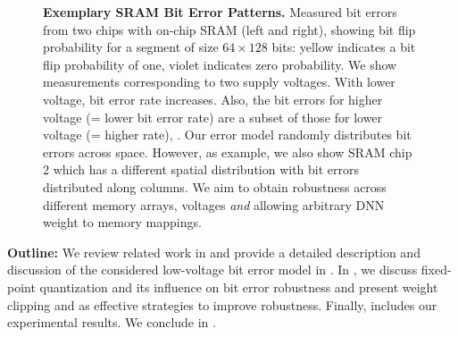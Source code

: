 \begin{figure}
	\vspace*{-8px}
	\caption{\textbf{Exemplary SRAM Bit Error Patterns.} Measured bit errors from two chips with on-chip SRAM (left and right), showing bit flip probability for a segment of size $64 \times 128$ bits: {\color{yellow!75!black}yellow} indicates a bit flip probability of one, {\color{violet}violet} indicates zero probability. We show measurements corresponding to two supply voltages. %
	With lower voltage, bit error rate increases. Also, the bit errors for higher voltage (= lower bit error rate) are a subset of those for lower voltage (= higher rate), \cf {}. Our error model randomly distributes bit errors across space. However, as example, we also show SRAM chip 2 which has a different spatial distribution with bit errors distributed along columns. We aim to obtain robustness across different memory arrays, voltages \emph{and} allowing arbitrary DNN weight to memory mappings.}
	\label{fig:errors}
\end{figure}

\textbf{Outline:} We review related work in  and provide a detailed description and discussion of the considered low-voltage bit error model in . In , we discuss fixed-point quantization and its influence on bit error robustness and present weight clipping and \Random as effective strategies to improve robustness. Finally,  includes our experimental results. We conclude in .